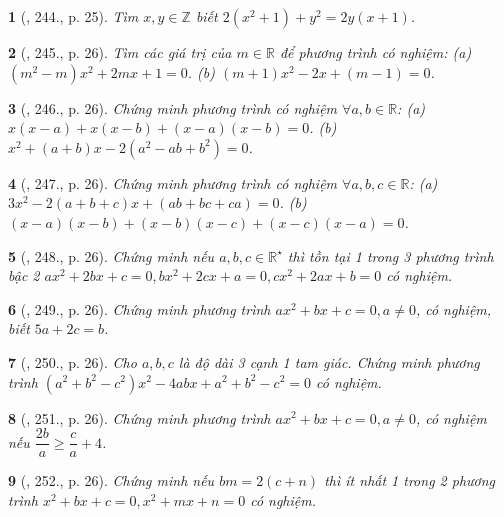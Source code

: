 \documentclass{article}
\newtheorem{baitoan}{}
\begin{document}
\begin{baitoan}[\cite{Binh_Toan_9_tap_2}, 244., p. 25]
	Tìm $x,y\in\mathbb{Z}$ biết $2(x^2 + 1) + y^2 = 2y(x + 1)$.
\end{baitoan}

\begin{baitoan}[\cite{Binh_Toan_9_tap_2}, 245., p. 26]
	Tìm các giá trị của $m\in\mathbb{R}$ để phương trình có nghiệm: (a) $(m^2 - m)x^2 + 2mx + 1 = 0$. (b) $(m + 1)x^2 - 2x + (m - 1) = 0$.
\end{baitoan}

\begin{baitoan}[\cite{Binh_Toan_9_tap_2}, 246., p. 26]
	Chứng minh phương trình có nghiệm $\forall a,b\in\mathbb{R}$: (a) $x(x - a) + x(x - b) + (x - a)(x - b) = 0$. (b) $x^2 + (a + b)x - 2(a^2 - ab + b^2) = 0$.
\end{baitoan}

\begin{baitoan}[\cite{Binh_Toan_9_tap_2}, 247., p. 26]
	Chứng minh phương trình có nghiệm $\forall a,b,c\in\mathbb{R}$: (a) $3x^2 - 2(a + b + c)x + (ab + bc + ca) = 0$. (b) $(x - a)(x - b) + (x - b)(x - c) + (x - c)(x - a) = 0$.
\end{baitoan}

\begin{baitoan}[\cite{Binh_Toan_9_tap_2}, 248., p. 26]
	Chứng minh nếu $a,b,c\in\mathbb{R}^\star$ thì tồn tại 1 trong 3 phương trình bậc 2 $ax^2 + 2bx + c = 0,bx^2 + 2cx + a = 0,cx^2 + 2ax + b = 0$ có nghiệm.
\end{baitoan}

\begin{baitoan}[\cite{Binh_Toan_9_tap_2}, 249., p. 26]
	Chứng minh phương trình $ax^2 + bx + c = 0,a\ne0$, có nghiệm, biết $5a + 2c = b$.
\end{baitoan}

\begin{baitoan}[\cite{Binh_Toan_9_tap_2}, 250., p. 26]
	Cho $a,b,c$ là độ dài 3 cạnh 1 tam giác. Chứng minh phương trình $(a^2 + b^2 - c^2)x^2 - 4abx + a^2 + b^2 - c^2 = 0$ có nghiệm.
\end{baitoan}

\begin{baitoan}[\cite{Binh_Toan_9_tap_2}, 251., p. 26]
	Chứng minh phương trình $ax^2 + bx + c = 0,a\ne0$, có nghiệm nếu $\dfrac{2b}{a}\ge\dfrac{c}{a} + 4$.
\end{baitoan}

\begin{baitoan}[\cite{Binh_Toan_9_tap_2}, 252., p. 26]
	Chứng minh nếu $bm = 2(c + n)$ thì ít nhất 1 trong 2 phương trình $x^2 + bx + c = 0,x^2 + mx + n = 0$ có nghiệm.
\end{baitoan}
\end{document}
